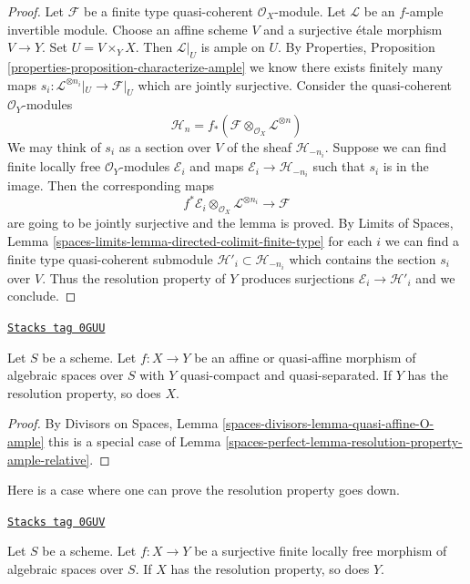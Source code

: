 \begin{proof}
Let $\mathcal{F}$ be a finite type quasi-coherent $\mathcal{O}_X$-module.
Let $\mathcal{L}$ be an $f$-ample invertible module.
Choose an affine scheme $V$ and a surjective \'etale morphism $V \to Y$.
Set $U = V \times_Y X$. Then $\mathcal{L}|_U$ is ample on $U$.
By Properties, Proposition
\ref{properties-proposition-characterize-ample}
we know there exists finitely many maps
$s_i : \mathcal{L}^{\otimes n_i}|_U \to \mathcal{F}|_U$
which are jointly surjective. Consider the quasi-coherent
$\mathcal{O}_Y$-modules
$$
\mathcal{H}_n =
f_*(\mathcal{F} \otimes_{\mathcal{O}_X} \mathcal{L}^{\otimes n})
$$
We may think of $s_i$ as a section over $V$ of the sheaf
$\mathcal{H}_{-n_i}$. Suppose we can find finite locally
free $\mathcal{O}_Y$-modules $\mathcal{E}_i$ and maps
$\mathcal{E}_i \to \mathcal{H}_{-n_i}$ such that
$s_i$ is in the image. Then the corresponding maps
$$
f^*\mathcal{E}_i
\otimes_{\mathcal{O}_X}
\mathcal{L}^{\otimes n_i} \longrightarrow \mathcal{F}
$$
are going to be jointly surjective and the lemma is proved. By
Limits of Spaces, Lemma \ref{spaces-limits-lemma-directed-colimit-finite-type}
for each $i$ we can find a finite type quasi-coherent submodule
$\mathcal{H}'_i \subset  \mathcal{H}_{-n_i}$
which contains the section $s_i$ over $V$.
Thus the resolution property of $Y$ produces surjections
$\mathcal{E}_i \to \mathcal{H}'_i$ and we conclude.
\end{proof}

\begin{lemma}
\label{spaces-perfect-lemma-resolution-property-goes-up-affine}
\href{https://stacks.math.columbia.edu/tag/0GUU}{\texttt{Stacks tag 0GUU}}

Let $S$ be a scheme.
Let $f : X \to Y$ be an affine or quasi-affine morphism of
algebraic spaces over $S$ with
$Y$ quasi-compact and quasi-separated.
If $Y$ has the resolution property, so does $X$.
\end{lemma}

\begin{proof}
By Divisors on Spaces, Lemma \ref{spaces-divisors-lemma-quasi-affine-O-ample}
this is a special case of
Lemma \ref{spaces-perfect-lemma-resolution-property-ample-relative}.
\end{proof}

Here is a case where one can prove the resolution property goes down.

\begin{lemma}
\label{spaces-perfect-lemma-resolution-property-goes-down-finite-flat}
\href{https://stacks.math.columbia.edu/tag/0GUV}{\texttt{Stacks tag 0GUV}}

Let $S$ be a scheme.
Let $f : X \to Y$ be a surjective finite locally free morphism of
algebraic spaces over $S$.
If $X$ has the resolution property, so does $Y$.
\end{lemma}

